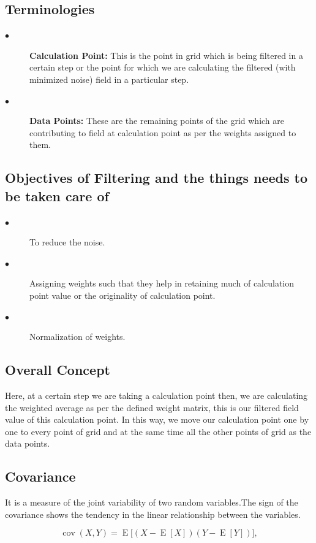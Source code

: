 \documentclass[a4paper,12pt]{report}
\begin{document}
\subsection{Terminologies} 
	\begin{description}
	\item[$\bullet$]\textbf{Calculation Point: }This is the point in grid which is being filtered in a certain step or the point for which we are calculating the filtered (with minimized noise) field in a particular step.\\ 
	\item[$\bullet$]\textbf{Data Points: }These are the remaining points of the grid which are contributing to field at calculation point as per the weights assigned to them.
	\end{description}  

\subsection{Objectives of Filtering and the things needs to be taken care of} 
	\begin{description}
	\item[$\bullet$]To reduce the noise.
	\item[$\bullet$]Assigning weights such that they help in 		retaining much of calculation point value or the 				originality of calculation point.
	\item[$\bullet$]Normalization of weights.
	\end{description}  
 
\subsection{Overall Concept}
 Here, at a certain step we are taking a calculation point then, we are calculating the weighted average as per the defined weight matrix, this is our filtered field value of this calculation point. In this way, we move our calculation point one by one to every point of grid and at the same time all the other points of grid as the data points.     
 
 
\subsection{Covariance}
It is a measure of the joint variability of two random variables.The sign of the covariance shows the tendency in the linear relationship between the variables.
 

$$
{\displaystyle \operatorname {cov} (X,Y)=\operatorname {E} {{\big [}(X-\operatorname {E} [X])(Y-\operatorname {E} [Y]){\big ]}},} 
$$
\end{document}
